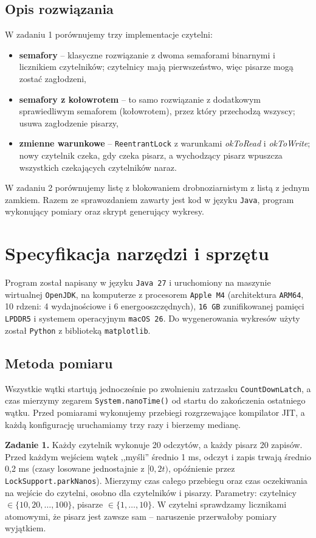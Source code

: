 \documentclass[11pt,a4paper]{article}
\begin{document}
\subsection{Opis rozwiązania}
W zadaniu 1 porównujemy trzy implementacje czytelni:
\begin{itemize}
    \item \textbf{semafory} -- klasyczne rozwiązanie z dwoma semaforami binarnymi i licznikiem czytelników;
          czytelnicy mają pierwszeństwo, więc pisarze mogą zostać zagłodzeni,
    \item \textbf{semafory z kołowrotem} -- to samo rozwiązanie z dodatkowym sprawiedliwym semaforem
          (kołowrotem), przez który przechodzą wszyscy; usuwa zagłodzenie pisarzy,
    \item \textbf{zmienne warunkowe} -- \texttt{ReentrantLock} z warunkami \textit{okToRead} i \textit{okToWrite};
          nowy czytelnik czeka, gdy czeka pisarz, a wychodzący pisarz wpuszcza wszystkich czekających
          czytelników naraz.
\end{itemize}
W zadaniu 2 porównujemy listę z blokowaniem drobnoziarnistym z listą z jednym zamkiem.
Razem ze sprawozdaniem zawarty jest kod w języku \texttt{Java}, program wykonujący pomiary
oraz skrypt generujący wykresy.

\section{Specyfikacja narzędzi i sprzętu}
Program został napisany w języku \texttt{Java 27} i uruchomiony na maszynie wirtualnej
\texttt{OpenJDK}, na komputerze z procesorem \texttt{Apple M4} (architektura \texttt{ARM64},
10 rdzeni: 4 wydajnościowe i 6 energooszczędnych), \texttt{16 GB} zunifikowanej pamięci
\texttt{LPDDR5} i systemem operacyjnym \texttt{macOS 26}.
Do wygenerowania wykresów użyty został \texttt{Python} z biblioteką \texttt{matplotlib}.

\subsection{Metoda pomiaru}
Wszystkie wątki startują jednocześnie po zwolnieniu zatrzasku \texttt{CountDownLatch}, a czas mierzymy
zegarem \texttt{System.nanoTime()} od startu do zakończenia ostatniego wątku. Przed pomiarami wykonujemy
przebiegi rozgrzewające kompilator JIT, a każdą konfigurację uruchamiamy trzy razy i bierzemy medianę.

\textbf{Zadanie 1.} Każdy czytelnik wykonuje 20 odczytów, a każdy pisarz 20 zapisów. Przed każdym
wejściem wątek ,,myśli'' średnio 1 ms, odczyt i zapis trwają średnio 0,2 ms (czasy losowane jednostajnie
z $[0, 2t)$, opóźnienie przez \texttt{LockSupport.parkNanos}). Mierzymy czas całego przebiegu oraz
czas oczekiwania na wejście do czytelni, osobno dla czytelników i pisarzy. Parametry: czytelnicy
$\in \{10, 20, \dots, 100\}$, pisarze $\in \{1, \dots, 10\}$. W czytelni sprawdzamy licznikami atomowymi,
że pisarz jest zawsze sam -- naruszenie przerwałoby pomiary wyjątkiem.
\end{document}

